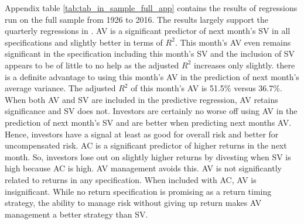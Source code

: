 Appendix table \ref{tab:tab_in_sample_full_app} contains the results of regressions run on the full sample from 1926 to 2016. The results largely support the quarterly regressions in \citet{pollet_average_2010}. AV is a significant predictor of next month’s SV in all specifications and slightly better in terms of $R^{2}$. This month’s AV even remains significant in the specification including this month’s SV and the inclusion of SV appears to be of little to no help as the adjusted $R^{2}$ increases only slightly. there is a definite advantage to using this month’s AV in the prediction of next month’s average variance. The adjusted $R^{2}$ of this month's AV is 51.5\% versus 36.7\%. When both AV and SV are included in the predictive regression, AV retains significance and SV does not. Investors are certainly no worse off using AV in the prediction of next month's SV and are better when predicting next months AV. Hence, investors have a signal at least as good for overall risk and better for uncompensated risk. AC is a significant predictor of higher returns in the next month. So, investors lose out on slightly higher returns by divesting when SV is high because AC is high. AV management avoids this. AV is not significantly related to returns in any specification. When included with AC, AV is insignificant. While no return specification is promising as a return timing strategy, the ability to manage risk without giving up return makes AV management a better strategy than SV.
